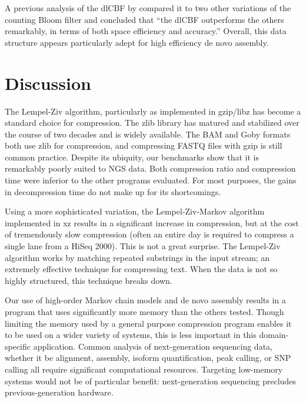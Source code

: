 \documentclass[twocolumn]{article}
\begin{document}
A previous analysis of the dlCBF by \citet{Zhang2009} compared it to two other
variations of the counting Bloom filter and concluded that ``the dlCBF
outperforms the others remarkably, in terms of both space efficiency and
accuracy.'' Overall, this data structure appears particularly adept for high
efficiency de novo assembly.

\section{Discussion}


The Lempel-Ziv algorithm, particularly as implemented in gzip/libz has become
a standard choice for compression. The zlib library has matured and stabilized
over the course of two decades and is widely available. The BAM and Goby
formats both use zlib for compression, and compressing FASTQ files with gzip
is still common practice. Despite its ubiquity, our benchmarks show that it is
remarkably poorly suited to NGS data. Both compression ratio and compression
time were inferior to the other programs evaluated. For most purposes, the
gains in decompression time do not make up for its shortcomings.

Using a more sophisticated variation, the Lempel-Ziv-Markov algorithm
implemented in xz results in a significant increase in compression, but at the
cost of tremendously slow compression (often an entire day is required to
compress a single lane from a HiSeq 2000). This is not a great surprise. The
Lempel-Ziv algorithm works by matching repeated substrings in the input
stream; an extremely effective technique for compressing text. When the data
is not so highly structured, this technique breaks down.


Our use of high-order Markov chain models and de novo assembly results in a
program that uses significantly more memory than the others tested. Though
limiting the memory used by a general purpose compression program enables it
to be used on a wider variety of systems, this is less important in this
domain-specific application. Common analysis of next-generation sequencing
data, whether it be alignment, assembly, isoform quantification, peak calling,
or SNP calling all require significant computational resources. Targeting
low-memory systems would not be of particular benefit: next-generation
sequencing precludes previous-generation hardware.




\end{document}
